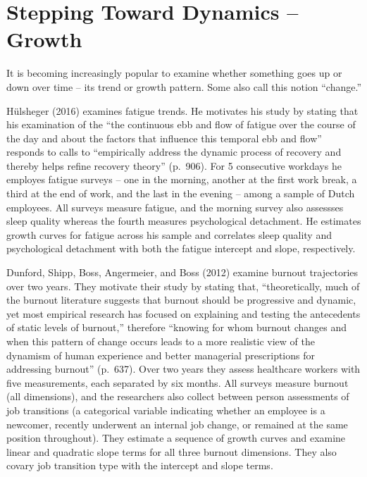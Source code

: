\documentclass[english,,man]{apa6}
\theoremstyle{definition}
\theoremstyle{definition}
\theoremstyle{definition}
\theoremstyle{remark}
\begin{document}
\hypertarget{stepping-toward-dynamics-growth}{%
\section{Stepping Toward Dynamics --
Growth}\label{stepping-toward-dynamics-growth}}

It is becoming increasingly popular to examine whether something goes up
or down over time -- its trend or growth pattern. Some also call this
notion \enquote{change.}

Hülsheger (2016) examines fatigue trends. He motivates his study by
stating that his examination of the \enquote{the continuous ebb and flow
of fatigue over the course of the day and about the factors that
influence this temporal ebb and flow} responds to calls to
\enquote{empirically address the dynamic process of recovery and thereby
helps refine recovery theory} (p.~906). For 5 consecutive workdays he
employes fatigue surveys -- one in the morning, another at the first
work break, a third at the end of work, and the last in the evening --
among a sample of Dutch employees. All surveys measure fatigue, and the
morning survey also assessses sleep quality whereas the fourth measures
psychological detachment. He estimates growth curves for fatigue across
his sample and correlates sleep quality and psychological detachment
with both the fatigue intercept and slope, respectively.

Dunford, Shipp, Boss, Angermeier, and Boss (2012) examine burnout
trajectories over two years. They motivate their study by stating that,
\enquote{theoretically, much of the burnout literature suggests that
burnout should be progressive and dynamic, yet most empirical research
has focused on explaining and testing the antecedents of static levels
of burnout,} therefore \enquote{knowing for whom burnout changes and
when this pattern of change occurs leads to a more realistic view of the
dynamism of human experience and better managerial prescriptions for
addressing burnout} (p.~637). Over two years they assess healthcare
workers with five measurements, each separated by six months. All
surveys measure burnout (all dimensions), and the researchers also
collect between person assessments of job transitions (a categorical
variable indicating whether an employee is a newcomer, recently
underwent an internal job change, or remained at the same position
throughout). They estimate a sequence of growth curves and examine
linear and quadratic slope terms for all three burnout dimensions. They
also covary job transition type with the intercept and slope terms.
\end{document}
